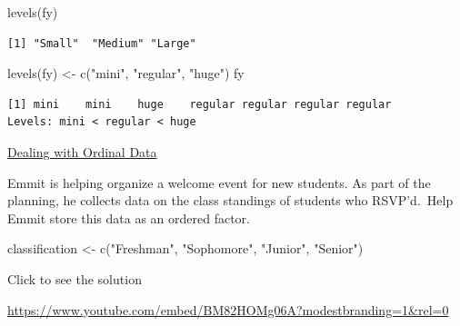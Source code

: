 \documentclass[
  letterpaper,
  DIV=11,
  numbers=noendperiod]{scrreprt}
\newenvironment{Shaded}{\begin{snugshade}}{\end{snugshade}}
\newcommand{\FunctionTok}[1]{\textcolor[rgb]{0.28,0.35,0.67}{#1}}
\newcommand{\NormalTok}[1]{\textcolor[rgb]{0.00,0.23,0.31}{#1}}
\newcommand{\OtherTok}[1]{\textcolor[rgb]{0.00,0.23,0.31}{#1}}
\newcommand{\StringTok}[1]{\textcolor[rgb]{0.13,0.47,0.30}{#1}}
\begin{document}
\begin{Shaded}
\begin{Highlighting}[]
\FunctionTok{levels}\NormalTok{(fy)}
\end{Highlighting}
\end{Shaded}

\begin{verbatim}
[1] "Small"  "Medium" "Large" 
\end{verbatim}

\begin{Shaded}
\begin{Highlighting}[]
\FunctionTok{levels}\NormalTok{(fy) }\OtherTok{\textless{}{-}} \FunctionTok{c}\NormalTok{(}\StringTok{"mini"}\NormalTok{, }\StringTok{"regular"}\NormalTok{, }\StringTok{"huge"}\NormalTok{)}
\NormalTok{fy}
\end{Highlighting}
\end{Shaded}

\begin{verbatim}
[1] mini    mini    huge    regular regular regular regular
Levels: mini < regular < huge
\end{verbatim}

\begin{watch}{}{}
    \href{https://youtu.be/_PfBPa3GQWM}{Dealing with Ordinal Data}
\end{watch}

\begin{tcolorbox}[enhanced jigsaw, colframe=quarto-callout-tip-color-frame, colback=white, breakable, rightrule=.15mm, title=\textcolor{quarto-callout-tip-color}{\faLightbulb}\hspace{0.5em}{Try it Out}, bottomtitle=1mm, toptitle=1mm, titlerule=0mm, left=2mm, coltitle=black, colbacktitle=quarto-callout-tip-color!10!white, leftrule=.75mm, opacitybacktitle=0.6, bottomrule=.15mm, opacityback=0, arc=.35mm, toprule=.15mm]

Emmit is helping organize a welcome event for new students. As part of
the planning, he collects data on the class standings of students who
RSVP'd.~Help Emmit store this data as an ordered factor.

\begin{Shaded}
\begin{Highlighting}[]
\NormalTok{classification }\OtherTok{\textless{}{-}} \FunctionTok{c}\NormalTok{(}\StringTok{"Freshman"}\NormalTok{, }\StringTok{"Sophomore"}\NormalTok{, }\StringTok{"Junior"}\NormalTok{, }\StringTok{"Senior"}\NormalTok{)}
\end{Highlighting}
\end{Shaded}

Click to see the solution

\url{https://www.youtube.com/embed/BM82HOMg06A?modestbranding=1&rel=0}

\end{tcolorbox}
\end{document}
